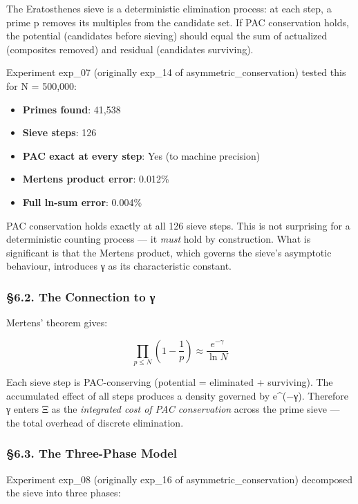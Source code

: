 \documentclass[
  11pt,
  a4paper]{article}
\providecommand{\tightlist}{%
  \setlength{\itemsep}{0pt}\setlength{\parskip}{0pt}}
\begin{document}
The Eratosthenes sieve is a deterministic elimination process: at each
step, a prime p removes its multiples from the candidate set. If PAC
conservation holds, the potential (candidates before sieving) should
equal the sum of actualized (composites removed) and residual
(candidates surviving).

Experiment exp\_07 (originally exp\_14 of asymmetric\_conservation)
tested this for N = 500,000:

\begin{itemize}
\tightlist
\item
  \textbf{Primes found}: 41,538
\item
  \textbf{Sieve steps}: 126
\item
  \textbf{PAC exact at every step}: Yes (to machine precision)
\item
  \textbf{Mertens product error}: 0.012\%
\item
  \textbf{Full ln-sum error}: 0.004\%
\end{itemize}

PAC conservation holds exactly at all 126 sieve steps. This is not
surprising for a deterministic counting process --- it \emph{must} hold
by construction. What is significant is that the Mertens product, which
governs the sieve's asymptotic behaviour, introduces γ as its
characteristic constant.

\subsubsection{§6.2. The Connection to γ}\label{the-connection-to-ux3b3}

Mertens' theorem gives:

\[\prod_{p \leq N} \left(1 - \frac{1}{p}\right) \approx \frac{e^{-\gamma}}{\ln N}\]

Each sieve step is PAC-conserving (potential = eliminated + surviving).
The accumulated effect of all steps produces a density governed by
e\^{}(−γ). Therefore γ enters Ξ as the \emph{integrated cost of PAC
conservation} across the prime sieve --- the total overhead of discrete
elimination.

\subsubsection{§6.3. The Three-Phase Model}\label{the-three-phase-model}

Experiment exp\_08 (originally exp\_16 of asymmetric\_conservation)
decomposed the sieve into three phases:
\end{document}
